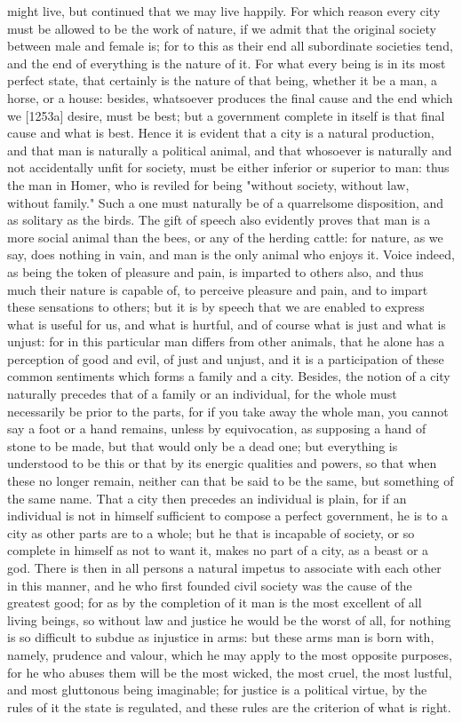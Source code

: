 \documentclass[12pt]{article}
\begin{document}
might live, but continued that we may live happily. For which reason every city must be allowed to be the work of nature, if we admit that the original society between male and female is; for to this as their end all subordinate societies tend, and the end of everything is the nature of it. For what every being is in its most perfect state, that certainly is the nature of that being, whether it be a man, a horse, or a house: besides, whatsoever produces the final cause and the end which we [1253a] desire, must be best; but a government complete in itself is that final cause and what is best. Hence it is evident that a city is a natural production, and that man is naturally a political animal, and that whosoever is naturally and not accidentally unfit for society, must be either inferior or superior to man: thus the man in Homer, who is reviled for being "without society, without law, without family." Such a one must naturally be of a quarrelsome disposition, and as solitary as the birds. The gift of speech also evidently proves that man is a more social animal than the bees, or any of the herding cattle: for nature, as we say, does nothing in vain, and man is the only animal who enjoys it. Voice indeed, as being the token of pleasure and pain, is imparted to others also, and thus much their nature is capable of, to perceive pleasure and pain, and to impart these sensations to others; but it is by speech that we are enabled to express what is useful for us, and what is hurtful, and of course what is just and what is unjust: for in this particular man differs from other animals, that he alone has a perception of good and evil, of just and unjust, and it is a participation of these common sentiments which forms a family and a city. Besides, the notion of a city naturally precedes that of a family or an individual, for the whole must necessarily be prior to the parts, for if you take away the whole man, you cannot say a foot or a hand remains, unless by equivocation, as supposing a hand of stone to be made, but that would only be a dead one; but everything is understood to be this or that by its energic qualities and powers, so that when these no longer remain, neither can that be said to be the same, but something of the same name. That a city then precedes an individual is plain, for if an individual is not in himself sufficient to compose a perfect government, he is to a city as other parts are to a whole; but he that is incapable of society, or so complete in himself as not to want it, makes no part of a city, as a beast or a god. There is then in all persons a natural impetus to associate with each other in this manner, and he who first founded civil society was the cause of the greatest good; for as by the completion of it man is the most excellent of all living beings, so without law and justice he would be the worst of all, for nothing is so difficult to subdue as injustice in arms: but these arms man is born with, namely, prudence and valour, which he may apply to the most opposite purposes, for he who abuses them will be the most wicked, the most cruel, the most lustful, and most gluttonous being imaginable; for justice is a political virtue, by the rules of it the state is regulated, and these rules are the criterion of what is right.
\end{document}
